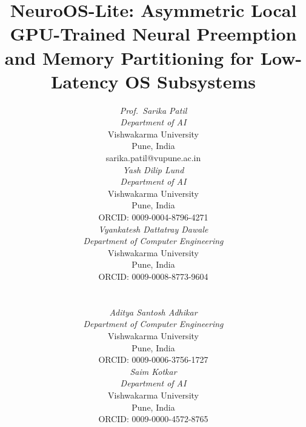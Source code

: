 \def\BibTeX{{\rm B\kern-.05em{\sc i\kern-.025em b}\kern-.08em
    T\kern-.1667em\lower.7ex\hbox{E}\kern-.125emX}}



\title{NeuroOS-Lite: Asymmetric Local GPU-Trained Neural Preemption and Memory Partitioning for Low-Latency OS Subsystems}

\newcommand{\authcell}[3]{\parbox[t]{0.315\textwidth}{\centering\small
  \textit{#1}\\[0.3ex]
  \textit{#2}\\
  Vishwakarma University\\
  Pune, India\\
  #3}}

\author{%
\authcell{Prof.\ Sarika Patil}{Department of AI}{sarika.patil@vupune.ac.in}%
\hfill
\authcell{Yash Dilip Lund}{Department of AI}{ORCID: 0009-0004-8796-4271}%
\hfill
\authcell{Vyankatesh Dattatray Dawale}{Department of Computer Engineering}{ORCID: 0009-0008-8773-9604}
\\[2.5ex]
\authcell{Aditya Santosh Adhikar}{Department of Computer Engineering}{ORCID: 0009-0006-3756-1727}%
\hspace{0.06\textwidth}%
\authcell{Saim Kotkar}{Department of AI}{ORCID: 0009-0000-4572-8765}
}

\maketitle

